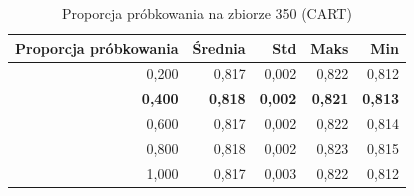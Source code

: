 \begin{table}[htbp]
\centering
\small
\setlength{\tabcolsep}{6pt}
\renewcommand{\arraystretch}{1.2}
\caption{Proporcja próbkowania na zbiorze 350 (CART)}
\label{tab:CART_sample_ratio_350}
\begin{tabular}{r|r|r|r|r}
\toprule
Proporcja próbkowania & Średnia & Std & Maks & Min \\
\hline
0,200 & 0,817 & 0,002 & 0,822 & 0,812 \\
\textbf{0,400} & \textbf{0,818} & \textbf{0,002} & \textbf{0,821} & \textbf{0,813} \\
0,600 & 0,817 & 0,002 & 0,822 & 0,814 \\
0,800 & 0,818 & 0,002 & 0,823 & 0,815 \\
1,000 & 0,817 & 0,003 & 0,822 & 0,812 \\
\bottomrule
\end{tabular}
\end{table}